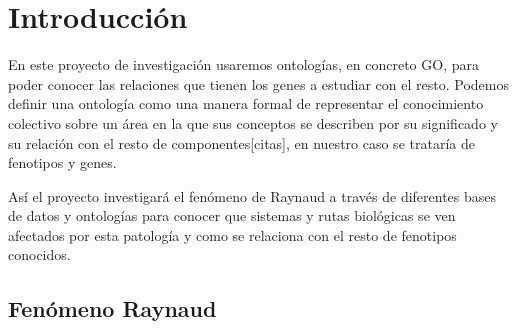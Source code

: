 \section{Introducción}

En este proyecto de investigación usaremos ontologías, en concreto GO, para poder conocer las relaciones que tienen los genes a estudiar con el resto. Podemos definir una ontología como una manera formal de representar el conocimiento colectivo sobre un área en la que sus conceptos se describen por su significado y su relación con el resto de componentes[citas], en nuestro caso se trataría de fenotipos y genes. 

Así el proyecto investigará el fenómeno de Raynaud a través de diferentes bases de datos y ontologías para conocer que sistemas y rutas biológicas se ven afectados por esta patología y como se relaciona con el resto de fenotipos conocidos.

\subsection{Fenómeno Raynaud}

